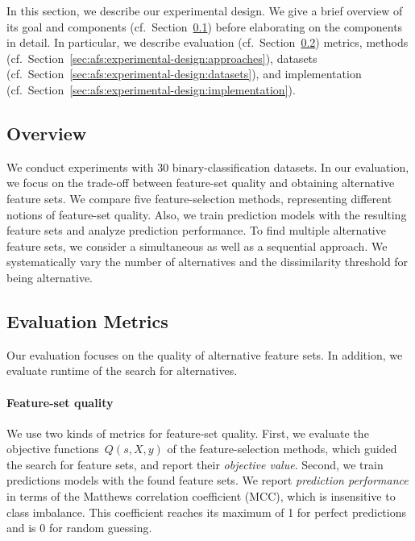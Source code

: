 \documentclass{article}
\theoremstyle{definition}
\begin{document}
In this section, we describe our experimental design.
We give a brief overview of its goal and components (cf.~Section~\ref{sec:afs:experimental-design:overview}) before elaborating on the components in detail.
In particular, we describe evaluation (cf.~Section~\ref{sec:afs:experimental-design:evaluation}) metrics, methods (cf.~Section~\ref{sec:afs:experimental-design:approaches}), datasets (cf.~Section~\ref{sec:afs:experimental-design:datasets}), and implementation (cf.~Section~\ref{sec:afs:experimental-design:implementation}).

\subsection{Overview}
\label{sec:afs:experimental-design:overview}

We conduct experiments with 30 binary-classification datasets.
In our evaluation, we focus on the trade-off between feature-set quality and obtaining alternative feature sets.
We compare five feature-selection methods, representing different notions of feature-set quality.
Also, we train prediction models with the resulting feature sets and analyze prediction performance.
To find multiple alternative feature sets, we consider a simultaneous as well as a sequential approach.
We systematically vary the number of alternatives and the dissimilarity threshold for being alternative.

\subsection{Evaluation Metrics}
\label{sec:afs:experimental-design:evaluation}

Our evaluation focuses on the quality of alternative feature sets.
In addition, we evaluate runtime of the search for alternatives.

\paragraph{Feature-set quality}

We use two kinds of metrics for feature-set quality.
First, we evaluate the objective functions~$Q(s,X,y)$ of the feature-selection methods, which guided the search for feature sets, and report their \emph{objective value}.
Second, we train predictions models with the found feature sets.
We report \emph{prediction performance} in terms of the Matthews correlation coefficient (MCC), which is insensitive to class imbalance.
This coefficient reaches its maximum of 1 for perfect predictions and is 0 for random guessing.
\end{document}
